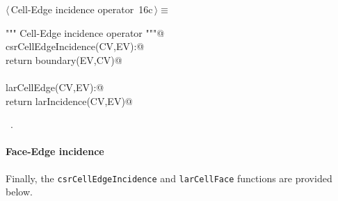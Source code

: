 \documentclass[11pt,oneside]{article}	%
\begin{document}
\begin{flushleft} \small \label{scrap28}
\protect{}$\langle\,$Cell-Edge incidence operator\nobreak\ {\footnotesize 16c}$\,\rangle\equiv$
\vspace{-1ex}
\begin{list}{}{} \item
\mbox{}\verb@""" Cell-Edge incidence operator """@\\
\mbox{}\verb@def csrCellEdgeIncidence(CV,EV):@\\
\mbox{}\verb@    return boundary(EV,CV)@\\
\mbox{}\verb@@\\
\mbox{}\verb@def larCellEdge(CV,EV):@\\
\mbox{}\verb@   return larIncidence(CV,EV)@\\
\mbox{}\verb@@{\NWsep}
\end{list}
\vspace{-1ex}
\footnotesize\addtolength{\baselineskip}{-1ex}
\begin{list}{}{\setlength{\itemsep}{-\parsep}\setlength{\itemindent}{-\leftmargin}}
\item \NWtxtMacroRefIn\ .
\end{list}
\end{flushleft}

\paragraph{Face-Edge incidence}
Finally, the \texttt{csrCellEdgeIncidence} and \texttt{larCellFace} functions are provided below.
\end{document}
